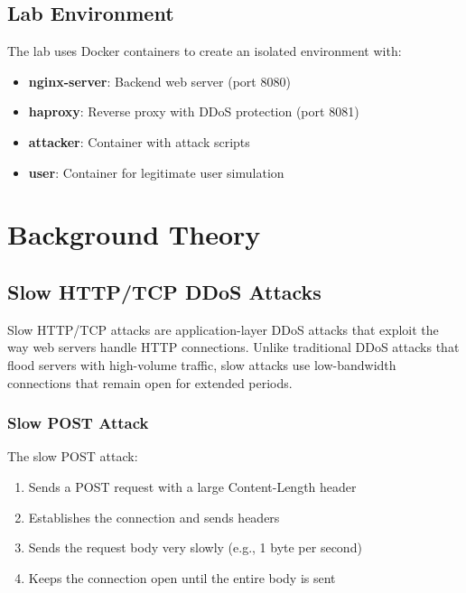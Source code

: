 \documentclass[12pt]{article}
\begin{document}
\subsection{Lab Environment}
The lab uses Docker containers to create an isolated environment with:
\begin{itemize}
    \item \textbf{nginx-server}: Backend web server (port 8080)
    \item \textbf{haproxy}: Reverse proxy with DDoS protection (port 8081)
    \item \textbf{attacker}: Container with attack scripts
    \item \textbf{user}: Container for legitimate user simulation
\end{itemize}

\section{Background Theory}

\subsection{Slow HTTP/TCP DDoS Attacks}

Slow HTTP/TCP attacks are application-layer DDoS attacks that exploit the way web servers handle HTTP connections. Unlike traditional DDoS attacks that flood servers with high-volume traffic, slow attacks use low-bandwidth connections that remain open for extended periods.

\subsubsection{Slow POST Attack}
The slow POST attack:
\begin{enumerate}
    \item Sends a POST request with a large Content-Length header
    \item Establishes the connection and sends headers
    \item Sends the request body very slowly (e.g., 1 byte per second)
    \item Keeps the connection open until the entire body is sent
\end{enumerate}
\end{document}
